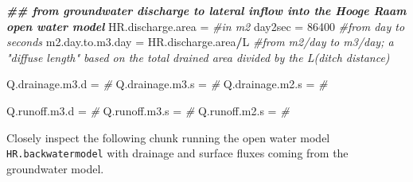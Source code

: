 \documentclass[
]{article}
\newenvironment{Shaded}{\begin{snugshade}}{\end{snugshade}}
\newcommand{\CommentTok}[1]{\textcolor[rgb]{0.56,0.35,0.01}{\textit{#1}}}
\newcommand{\DecValTok}[1]{\textcolor[rgb]{0.00,0.00,0.81}{#1}}
\newcommand{\DocumentationTok}[1]{\textcolor[rgb]{0.56,0.35,0.01}{\textbf{\textit{#1}}}}
\newcommand{\NormalTok}[1]{#1}
\newcommand{\OtherTok}[1]{\textcolor[rgb]{0.56,0.35,0.01}{#1}}
\newcommand{\SpecialCharTok}[1]{\textcolor[rgb]{0.81,0.36,0.00}{\textbf{#1}}}
\begin{document}
\begin{Shaded}
\begin{Highlighting}[]
\DocumentationTok{\#\# from groundwater discharge to lateral inflow into the Hooge Raam open water model}
\NormalTok{HR.discharge.area }\OtherTok{=}  \CommentTok{\#in m2}
\NormalTok{day2sec }\OtherTok{=} \DecValTok{86400} \CommentTok{\#from day to seconds}
\NormalTok{m2.day.to.m3.day }\OtherTok{=}\NormalTok{   HR.discharge.area}\SpecialCharTok{/}\NormalTok{L }\CommentTok{\#from m2/day to m3/day; a "diffuse length" based on the total drained area divided by the L(ditch distance)}

\NormalTok{Q.drainage.m3.d }\OtherTok{=} \CommentTok{\#}
\NormalTok{Q.drainage.m3.s }\OtherTok{=} \CommentTok{\#}
\NormalTok{Q.drainage.m2.s }\OtherTok{=} \CommentTok{\#}

\NormalTok{Q.runoff.m3.d }\OtherTok{=} \CommentTok{\#}
\NormalTok{Q.runoff.m3.s }\OtherTok{=} \CommentTok{\#}
\NormalTok{Q.runoff.m2.s }\OtherTok{=} \CommentTok{\#}
\end{Highlighting}
\end{Shaded}

Closely inspect the following chunk running the open water model
\texttt{HR.backwatermodel} with drainage and surface fluxes coming from
the groundwater model.
\end{document}
